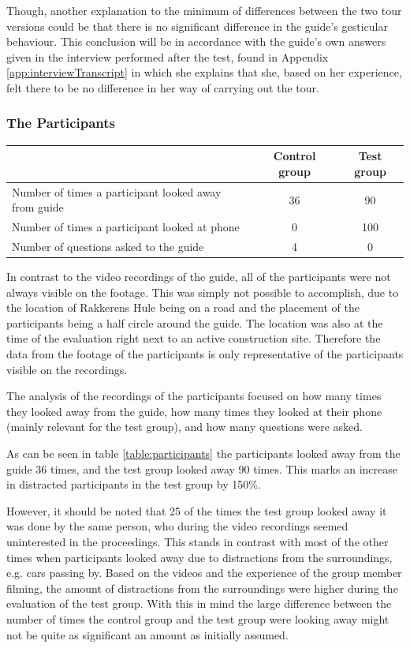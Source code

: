 Though, another explanation to the minimum of differences between the two tour versions could be that there is no significant difference in the guide’s gesticular behaviour. This conclusion will be in accordance with the guide’s own answers given in the interview performed after the test, found in Appendix \ref{app:interviewTranscript} in which she explains that she, based on her experience, felt there to be no difference in her way of carrying out the tour.  

\subsubsection{The Participants}


\begin{tabular}{| p{8cm} | c | c |}\hline \label{table:participants}
 & Control group & Test group \\ \hline
Number of times a participant looked away from guide & 36 & 90 \\ \hline
Number of times a participant looked at phone & 0 & 100 \\ \hline
Number of questions asked to the guide & 4 & 0 \\  \hline
\end{tabular}


In contrast to the video recordings of the guide, all of the participants were not always visible on the footage. This was simply not possible to accomplish, due to the location of Rakkerens Hule being on a road and the placement of the participants being a half circle around the guide. The location was also at the time of the evaluation right next to an active construction site. Therefore the data from the footage of the participants is only representative of the participants visible on the recordings. 

The analysis of the recordings of the participants focused on how many times they looked away from the guide, how many times they looked at their phone (mainly relevant for the test group), and how many questions were asked. 

As can be seen in table \ref{table:participants} the participants looked away from the guide 36 times, and the test group looked away 90 times. This marks an increase in distracted participants in the test group by 150\%. 

However, it should be noted that 25 of the times the test group looked away it was done by the same person, who during the video recordings seemed uninterested in the proceedings. This stands in contrast with  most of the other times when participants looked away due to distractions from the surroundings, e.g. cars passing by. Based on the videos and the experience of the group member filming, the amount of distractions from the surroundings were higher during the evaluation of the test group. With this in mind the large difference between the number of times the control group and the test group were looking away might not be quite as significant an amount as initially assumed. 

